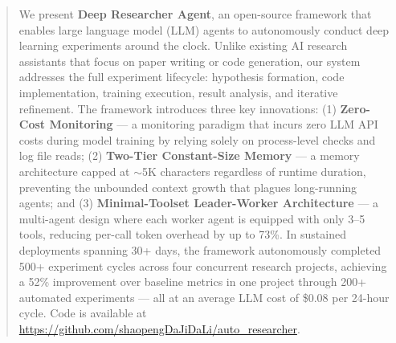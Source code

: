 \begin{abstract}
We present \textbf{Deep Researcher Agent}, an open-source framework that enables large language model (LLM) agents to autonomously conduct deep learning experiments around the clock. Unlike existing AI research assistants that focus on paper writing or code generation, our system addresses the full experiment lifecycle: hypothesis formation, code implementation, training execution, result analysis, and iterative refinement. The framework introduces three key innovations: (1) \textbf{Zero-Cost Monitoring} --- a monitoring paradigm that incurs zero LLM API costs during model training by relying solely on process-level checks and log file reads; (2) \textbf{Two-Tier Constant-Size Memory} --- a memory architecture capped at $\sim$5K characters regardless of runtime duration, preventing the unbounded context growth that plagues long-running agents; and (3) \textbf{Minimal-Toolset Leader-Worker Architecture} --- a multi-agent design where each worker agent is equipped with only 3--5 tools, reducing per-call token overhead by up to 73\%. In sustained deployments spanning 30+ days, the framework autonomously completed 500+ experiment cycles across four concurrent research projects, achieving a 52\% improvement over baseline metrics in one project through 200+ automated experiments --- all at an average LLM cost of \$0.08 per 24-hour cycle. Code is available at \url{https://github.com/shaopengDaJiDaLi/auto_researcher}.
\end{abstract}
